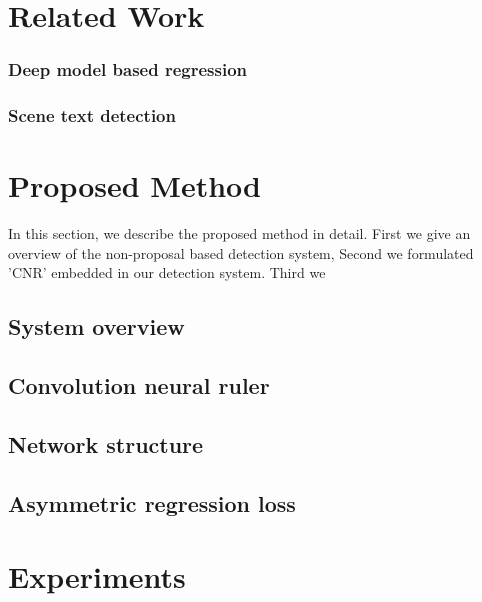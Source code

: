 \documentclass[10pt,twocolumn,letterpaper]{article}
\begin{document}


\section{Related Work}

\subsubsection{Deep model based regression}

\subsubsection{Scene text detection}

\section{Proposed Method}
In this section, we describe the proposed method in detail. First we give an overview of the non-proposal based detection system, Second we formulated 'CNR' embedded in our detection system. Third we 

\subsection{System overview}

\subsection{Convolution neural ruler}

\subsection{Network structure}

\subsection{Asymmetric regression loss}

\section{Experiments}
\end{document}

